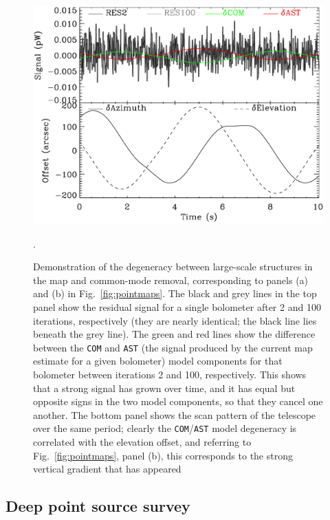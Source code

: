 \documentclass[useAMS,usenatbib,nofootinbib]{mn2e}
\newcommand{\model}[1]{\texttt{#1}}
\begin{document}
\begin{figure}
\centering
\includegraphics[width=\linewidth]{degeneracy.pdf}
\caption{Demonstration of the degeneracy between large-scale
  structures in the map and common-mode removal, corresponding to
  panels (a) and (b) in Fig.~\ref{fig:pointmaps}. The black and grey
  lines in the top panel show the residual signal for a single
  bolometer after 2 and 100 iterations, respectively (they are nearly
  identical; the black line lies beneath the grey line). The green and
  red lines show the difference between the \model{COM} and
  \model{AST} (the signal produced by the current map estimate for a
  given bolometer) model components for that bolometer between
  iterations 2 and 100, respectively. This shows that a strong signal
  has grown over time, and it has equal but opposite signs in the two
  model components, so that they cancel one another. The bottom panel
  shows the scan pattern of the telescope over the same period;
  clearly the \model{COM}/\model{AST} model degeneracy is correlated
  with the elevation offset, and referring to
  Fig.~\ref{fig:pointmaps}, panel (b), this corresponds to the strong
  vertical gradient that has appeared}.
\label{fig:degeneracy}
\end{figure}

\subsection{Deep point source survey}
\label{sec:cosmo}
\end{document}

